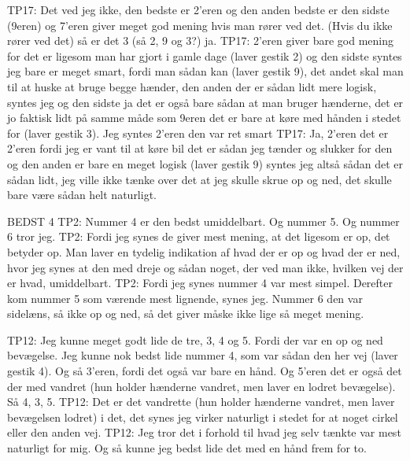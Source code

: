 TP17: Det ved jeg ikke, den bedste er 2’eren og den anden bedste er den sidste (9eren) og 7’eren giver meget god mening hvis man rører ved det.  (Hvis du ikke rører ved det) så er det 3 (så 2, 9 og 3?) ja.
TP17: 2’eren giver bare god mening for det er ligesom man har gjort i gamle dage (laver gestik 2) og den sidste syntes jeg bare er meget smart, fordi man sådan kan (laver gestik 9), det andet skal man til at huske at bruge begge hænder, den anden der er sådan lidt mere logisk, syntes jeg og den sidste ja det er også bare sådan at man bruger hænderne, det er jo faktisk lidt på samme måde som 9eren det er bare at køre med hånden i stedet for (laver gestik 3). Jeg syntes 2’eren den var ret smart
TP17: Ja, 2’eren det er 2’eren fordi jeg er vant til at køre bil det er sådan jeg tænder og slukker for den og den anden er bare en meget logisk (laver gestik 9) syntes jeg altså sådan det er sådan lidt, jeg ville ikke tænke over det at jeg skulle skrue op og ned, det skulle bare være sådan helt naturligt.









BEDST 4 
TP2: Nummer 4 er den bedst umiddelbart. Og nummer 5. Og nummer 6 tror jeg.
TP2: Fordi jeg synes de giver mest mening, at det ligesom er op, det betyder op. Man laver en tydelig indikation af hvad der er op og hvad der er ned, hvor jeg synes at den med dreje og sådan noget, der ved man ikke, hvilken vej der er hvad, umiddelbart.
TP2: Fordi jeg synes nummer 4 var mest simpel. Derefter kom nummer 5 som værende mest lignende, synes jeg. Nummer 6 den var sidelæns, så ikke op og ned, så det giver måske ikke lige så meget mening.  


TP12: Jeg kunne meget godt lide de tre, 3, 4 og 5. Fordi der var en op og ned bevægelse. Jeg kunne nok bedst lide nummer 4, som var sådan den her vej (laver gestik 4). Og så 3’eren, fordi det også var bare en hånd. Og 5’eren det er også det der med vandret (hun holder hænderne vandret, men laver en lodret bevægelse). Så 4, 3, 5. 
TP12: Det er det vandrette (hun holder hænderne vandret, men laver bevægelsen lodret) i det, det synes jeg virker naturligt i stedet for at noget cirkel eller den anden vej. 
TP12: Jeg tror det i forhold til hvad jeg selv tænkte var mest naturligt for mig. Og så kunne jeg bedst lide det med en hånd frem for to. 

